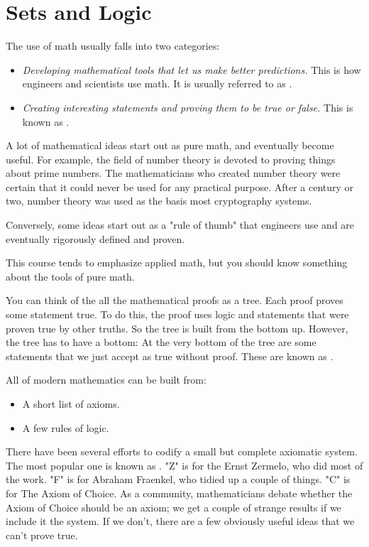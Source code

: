 \chapter{Sets and Logic}

The use of math usually falls into two categories:
\begin{itemize}
\item \textit{Developing mathematical tools that let us make better predictions.}  This is how engineers and scientists use math.  It is usually referred to as .
\item \textit{Creating interesting statements and proving them to be true or false.}  This is known as .
\end{itemize}

A lot of mathematical ideas start out as pure math, and eventually
become useful.  For example, the field of number theory is devoted to
proving things about prime numbers.  The mathematicians who created
number theory were certain that it could never be used for any
practical purpose.  After a century or two, number theory was used as
the basis most cryptography systems.

Conversely, some ideas start out as a "rule of thumb" that engineers use and are
eventually rigorously defined and proven.

This course tends to emphasize applied math, but you should know
something about the tools of pure math.

You can think of the all the mathematical proofs as a tree. Each proof
proves some statement true. To do this, the proof uses logic and
statements that were proven true by other truths. So the tree is built
from the bottom up.  However, the tree has to have a bottom: At the
very bottom of the tree are some statements that we just accept as
true without proof.  These are known as .

All of modern mathematics can be built from:
\begin{itemize}
\item A short list of axioms.
\item A few rules of logic.
\end{itemize}

There have been several efforts to codify a small but complete
axiomatic system. The most popular one is known as .  "Z"
is for the Ernst Zermelo, who did most of the work.  "F" is for
Abraham Fraenkel, who tidied up a couple of things. "C" is for The
Axiom of Choice.  As a community, mathematicians debate whether the
Axiom of Choice should be an axiom; we get a couple of strange results
if we include it the system.  If we don't, there are a few obviously
useful ideas that we can't prove true.

